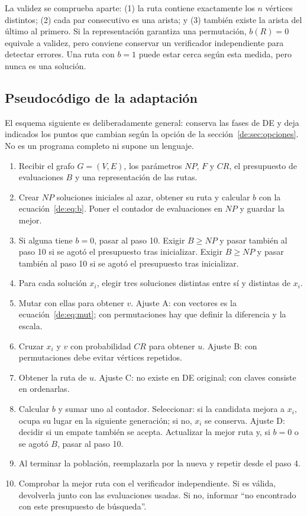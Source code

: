 La validez se comprueba aparte: (1) la ruta contiene exactamente los $n$ vértices distintos; (2) cada par consecutivo es una arista; y (3) también existe la arista del último al primero. Si la representación garantiza una permutación, $b(R)=0$ equivale a validez, pero conviene conservar un verificador independiente para detectar errores. Una ruta con $b=1$ puede estar cerca según esta medida, pero nunca es una solución.

\subsection{Pseudocódigo de la adaptación}\label{de:sec:pseudo}
El esquema siguiente es deliberadamente general: conserva las fases de DE y deja indicados los puntos que cambian según la opción de la sección~\ref{de:sec:opciones}. No es un programa completo ni supone un lenguaje.
\begin{enumerate}[leftmargin=*,label=\arabic*.]
\item Recibir el grafo $G=(V,E)$, los parámetros $NP$, $F$ y $CR$, el presupuesto de evaluaciones $B$ y una representación de las rutas.
\item Crear $NP$ soluciones iniciales al azar, obtener su ruta y calcular $b$ con la ecuación~\eqref{de:eq:b}. Poner el contador de evaluaciones en $NP$ y guardar la mejor.
\item Si alguna tiene $b=0$, pasar al paso 10. Exigir $B\geq NP$ y pasar también al paso 10 si se agotó el presupuesto tras inicializar. Exigir $B\geq NP$ y pasar también al paso 10 si se agotó el presupuesto tras inicializar.
\item Para cada solución $x_i$, elegir tres soluciones distintas entre sí y distintas de $x_i$.
\item Mutar con ellas para obtener $v$. Ajuste A: con vectores es la ecuación~\eqref{de:eq:mut}; con permutaciones hay que definir la diferencia y la escala.
\item Cruzar $x_i$ y $v$ con probabilidad $CR$ para obtener $u$. Ajuste B: con permutaciones debe evitar vértices repetidos.
\item Obtener la ruta de $u$. Ajuste C: no existe en DE original; con claves consiste en ordenarlas.
\item Calcular $b$ y sumar uno al contador. Seleccionar: si la candidata mejora a $x_i$, ocupa su lugar en la siguiente generación; si no, $x_i$ se conserva. Ajuste D: decidir si un empate también se acepta. Actualizar la mejor ruta y, si $b=0$ o se agotó $B$, pasar al paso 10.
\item Al terminar la población, reemplazarla por la nueva y repetir desde el paso 4.
\item Comprobar la mejor ruta con el verificador independiente. Si es válida, devolverla junto con las evaluaciones usadas. Si no, informar ``no encontrado con este presupuesto de búsqueda''.
\end{enumerate}

